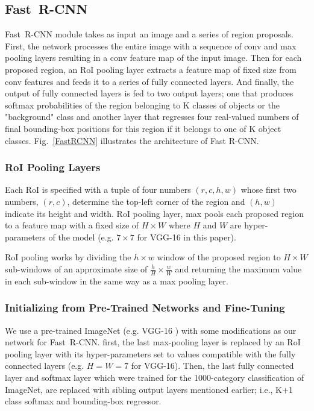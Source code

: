 \documentclass[conference]{IEEEtran}
\newcommand{\fast}[0]{\mbox{Fast~R-CNN}}
\begin{document}
\subsection{\fast{}}
\fast{} module takes as input an image and a series of region proposals. First, the network processes the entire image with a sequence of conv and max pooling layers resulting in a conv feature map of the input image. Then for each proposed region, an RoI pooling layer extracts a feature map of fixed size from conv features and feeds it to a series of fully connected layers. And finally, the output of fully connected layers is fed to two output layers; one that produces softmax probabilities of the region belonging to K classes of objects or the "background" class and another layer that regresses four real-valued numbers of final bounding-box positions for this region if it belongs to one of K object classes.
Fig.~\ref{FastRCNN} illustrates the architecture of Fast R-CNN.

\subsubsection{RoI Pooling Layers}
Each RoI is specified with a tuple of four numbers $(r, c, h, w)$ whose first two numbers, $(r, c)$, determine the top-left corner of the region and $(h, w)$ indicate its height and width. RoI pooling layer, max pools each proposed region to a feature map with a fixed size of $H\times W$ where $H$ and $W$ are hyper-parameters of the model (e.g. $7\times 7$ for VGG-16 in this paper).

RoI pooling works by dividing the $h\times w$ window of the proposed region to  $H\times W$ sub-windows of an approximate size of $\frac{h}{H}\times \frac{w}{W}$ and returning the maximum value in each sub-window 
in the same way as a max pooling layer.

\subsubsection{Initializing from Pre-Trained Networks and Fine-Tuning}
\label{InitNetwork}
We use a pre-trained ImageNet \cite{a4} (e.g. VGG-16 \cite{a20}) with some modifications as our network for \fast{}. first, the last max-pooling layer is replaced by an RoI pooling layer with its hyper-parameters set to values compatible with the fully connected layers (e.g. $H=W=7$ for VGG-16). Then, the last fully connected layer and softmax layer which were trained for the 1000-category classification of ImageNet, are replaced with sibling output layers mentioned earlier;
i.e., K+1 class softmax and bounding-box regressor.
\end{document}
